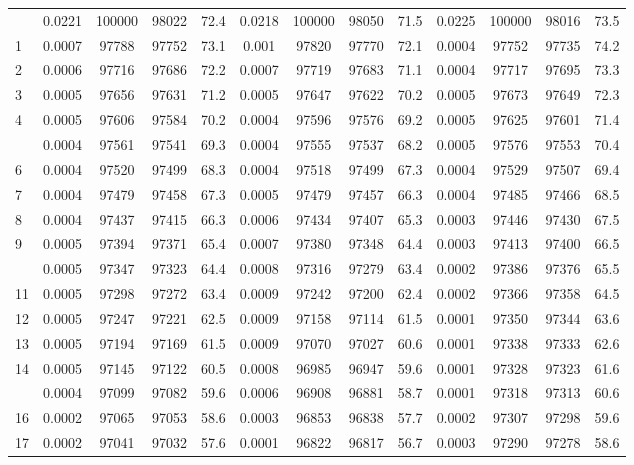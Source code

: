 \documentclass[
  14pt,
]{article}
\begin{document}
\begin{longtable}[t]{lcccccccccccc}
\endfoot
\bottomrule
\endlastfoot
0 & 0.0221 & 100000 & 98022 & 72.4 & 0.0218 & 100000 & 98050 & 71.5 & 0.0225 & 100000 & 98016 & 73.5\\
1 & 0.0007 & 97788 & 97752 & 73.1 & 0.001 & 97820 & 97770 & 72.1 & 0.0004 & 97752 & 97735 & 74.2\\
2 & 0.0006 & 97716 & 97686 & 72.2 & 0.0007 & 97719 & 97683 & 71.1 & 0.0004 & 97717 & 97695 & 73.3\\
3 & 0.0005 & 97656 & 97631 & 71.2 & 0.0005 & 97647 & 97622 & 70.2 & 0.0005 & 97673 & 97649 & 72.3\\
4 & 0.0005 & 97606 & 97584 & 70.2 & 0.0004 & 97596 & 97576 & 69.2 & 0.0005 & 97625 & 97601 & 71.4\\
\addlinespace
5 & 0.0004 & 97561 & 97541 & 69.3 & 0.0004 & 97555 & 97537 & 68.2 & 0.0005 & 97576 & 97553 & 70.4\\
6 & 0.0004 & 97520 & 97499 & 68.3 & 0.0004 & 97518 & 97499 & 67.3 & 0.0004 & 97529 & 97507 & 69.4\\
7 & 0.0004 & 97479 & 97458 & 67.3 & 0.0005 & 97479 & 97457 & 66.3 & 0.0004 & 97485 & 97466 & 68.5\\
8 & 0.0004 & 97437 & 97415 & 66.3 & 0.0006 & 97434 & 97407 & 65.3 & 0.0003 & 97446 & 97430 & 67.5\\
9 & 0.0005 & 97394 & 97371 & 65.4 & 0.0007 & 97380 & 97348 & 64.4 & 0.0003 & 97413 & 97400 & 66.5\\
\addlinespace
10 & 0.0005 & 97347 & 97323 & 64.4 & 0.0008 & 97316 & 97279 & 63.4 & 0.0002 & 97386 & 97376 & 65.5\\
11 & 0.0005 & 97298 & 97272 & 63.4 & 0.0009 & 97242 & 97200 & 62.4 & 0.0002 & 97366 & 97358 & 64.5\\
12 & 0.0005 & 97247 & 97221 & 62.5 & 0.0009 & 97158 & 97114 & 61.5 & 0.0001 & 97350 & 97344 & 63.6\\
13 & 0.0005 & 97194 & 97169 & 61.5 & 0.0009 & 97070 & 97027 & 60.6 & 0.0001 & 97338 & 97333 & 62.6\\
14 & 0.0005 & 97145 & 97122 & 60.5 & 0.0008 & 96985 & 96947 & 59.6 & 0.0001 & 97328 & 97323 & 61.6\\
\addlinespace
15 & 0.0004 & 97099 & 97082 & 59.6 & 0.0006 & 96908 & 96881 & 58.7 & 0.0001 & 97318 & 97313 & 60.6\\
16 & 0.0002 & 97065 & 97053 & 58.6 & 0.0003 & 96853 & 96838 & 57.7 & 0.0002 & 97307 & 97298 & 59.6\\
17 & 0.0002 & 97041 & 97032 & 57.6 & 0.0001 & 96822 & 96817 & 56.7 & 0.0003 & 97290 & 97278 & 58.6\\

\end{longtable}
\end{document}
